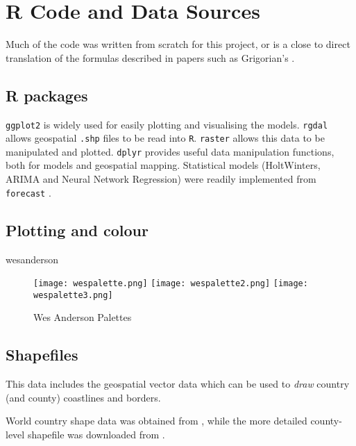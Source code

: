 \section{R Code and Data Sources}
\label{ch:codesource}

Much of the code was written from scratch for this project, or is a close to direct translation of the formulas described in papers such as Grigorian's \cite{grigor20}.

\subsection{R packages}

\verb|ggplot2|  \cite{ggplot2} is widely used for easily plotting and visualising the models. \verb|rgdal| \cite{rgdal} allows geospatial \verb|.shp| files to be read into \verb|R|. \verb|raster| \cite{raster} allows this data to be manipulated and plotted. \verb|dplyr| \cite{dplyr}  provides useful data manipulation functions, both for models and geospatial mapping. Statistical models (HoltWinters, ARIMA and Neural Network Regression) were readily implemented from \verb|forecast| \cite{forecast}.

\subsection{Plotting and colour}

wesanderson \cite{wesanderson20}

\begin{figure}[!htb]
  \texttt{[image: wespalette.png]} \label{fig:wespalette}
  \texttt{[image: wespalette2.png]} \label{fig:wespalette2}
  \texttt{[image: wespalette3.png]} \label{fig:wespalette3}
\endminipage
\caption{Wes Anderson Palettes}
\end{figure}


\subsection{Shapefiles}

This data includes the geospatial vector data which can be used to \textit{draw} country (and county) coastlines and borders. 

World country shape data was obtained from \cite{countryshape}, while the more detailed county-level shapefile was downloaded from \cite{countyshape}.



